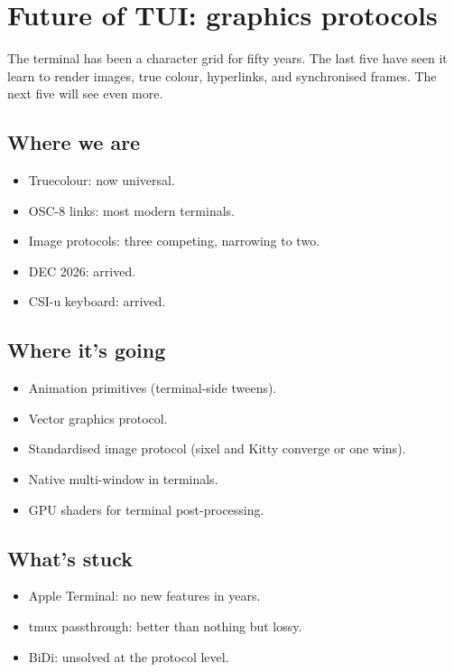 \chapter{Future of TUI: graphics protocols}
\label{ch:future_graphics}

\begin{aside}
The terminal has been a character grid for fifty years. The
last five have seen it learn to render images, true colour,
hyperlinks, and synchronised frames. The next five will see
even more.
\end{aside}

\section{Where we are}

\begin{itemize}[leftmargin=*]
  \item Truecolour: now universal.
  \item OSC-8 links: most modern terminals.
  \item Image protocols: three competing, narrowing to two.
  \item DEC 2026: arrived.
  \item CSI-u keyboard: arrived.
\end{itemize}

\section{Where it's going}

\begin{itemize}[leftmargin=*]
  \item Animation primitives (terminal-side tweens).
  \item Vector graphics protocol.
  \item Standardised image protocol (sixel and Kitty
    converge or one wins).
  \item Native multi-window in terminals.
  \item GPU shaders for terminal post-processing.
\end{itemize}

\section{What's stuck}

\begin{itemize}[leftmargin=*]
  \item Apple Terminal: no new features in years.
  \item tmux passthrough: better than nothing but lossy.
  \item BiDi: unsolved at the protocol level.
\end{itemize}

